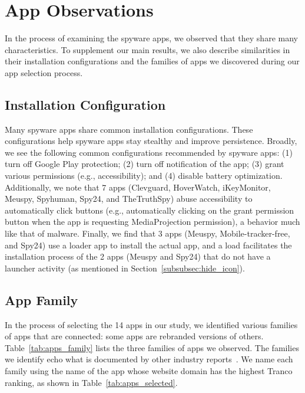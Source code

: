 \documentclass[sigconf,balance=false]{acmart}
\begin{document}
\newpage
\hspace*{0.1in}\newpage
\appendix


\section{App Observations}
\label{subsec:additional_observation}

In the process of examining the spyware apps, we observed that they
share many characteristics.  To supplement our main results, we also
describe similarities in their installation configurations and the
families of apps we discovered during our app selection process.

\subsection{Installation Configuration}
\label{subsubsec:install_configure}

Many spyware apps share common installation configurations.  These
configurations help spyware apps stay stealthy and improve
persistence. Broadly, we see the following common configurations
recommended by spyware apps: (1) turn off Google Play protection; (2)
turn off notification of the app; (3) grant various permissions (e.g.,
accessibility); and (4) disable battery optimization.  Additionally,
we note that 7 apps (Clevguard, HoverWatch, iKeyMonitor, Meuspy, Spyhuman, Spy24, and TheTruthSpy) abuse accessibility to
automatically click buttons (e.g., automatically clicking on the grant permission button when the app is requesting MediaProjection permission), a
behavior much like that of malware. Finally, we find that 3 apps
(Meuspy, Mobile-tracker-free, and Spy24) use a loader app to install
the actual app, and a load facilitates the installation process of the 2 apps (Meuspy and Spy24) that do not have a launcher activity (as mentioned in Section~\ref{subsubsec:hide_icon}).

\subsection{App Family}
\label{subsubsec:app_family}

In the process of selecting the 14 apps in our study, we identified
various families of apps that are connected: some apps
are rebranded versions of others.  Table~\ref{tab:apps_family} lists the
three families of apps we observed. The families we identify echo what is documented by
other industry reports~\cite{Tekstalk86:online,
esetandr4:online}. We name each family using the name
of the app whose website domain has the highest Tranco ranking, as shown in
Table~\ref{tab:apps_selected}.
\end{document}
